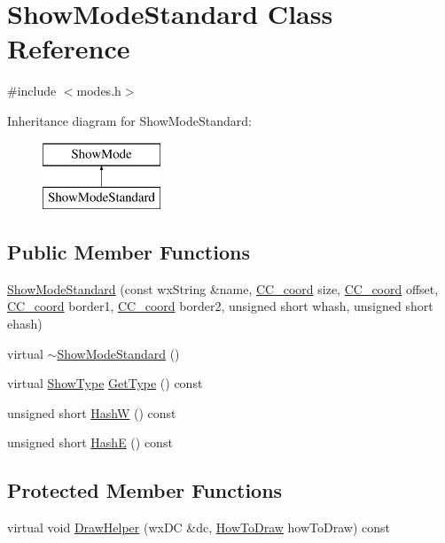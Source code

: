 \hypertarget{a00143}{\section{Show\-Mode\-Standard Class Reference}
\label{a00143}
}


{\ttfamily \#include $<$modes.\-h$>$}

Inheritance diagram for Show\-Mode\-Standard\-:\begin{figure}[H]
\begin{center}
\leavevmode
\includegraphics[height=2.000000cm]{a00143}
\end{center}
\end{figure}
\subsection*{Public Member Functions}
\begin{DoxyCompactItemize}
\item 
\hyperlink{a00143_a53cf0b052b5a1a1063d29d54f66802a9}{Show\-Mode\-Standard} (const wx\-String \&name, \hyperlink{a00029}{C\-C\-\_\-coord} size, \hyperlink{a00029}{C\-C\-\_\-coord} offset, \hyperlink{a00029}{C\-C\-\_\-coord} border1, \hyperlink{a00029}{C\-C\-\_\-coord} border2, unsigned short whash, unsigned short ehash)
\item 
virtual \hyperlink{a00143_a60a6932419eefa7b620f7482bc8b2c5e}{$\sim$\-Show\-Mode\-Standard} ()
\item 
virtual \hyperlink{a00140_a03678eaf2ac733b19b863d9fef35077c}{Show\-Type} \hyperlink{a00143_ac5940b26b7d0a30a8c37966853fdb8a7}{Get\-Type} () const 
\item 
unsigned short \hyperlink{a00143_a7fd90cab74eea075fa43dde0612be3f6}{Hash\-W} () const 
\item 
unsigned short \hyperlink{a00143_a9bd103ae17dce96531b99d510b4850aa}{Hash\-E} () const 
\end{DoxyCompactItemize}
\subsection*{Protected Member Functions}
\begin{DoxyCompactItemize}
\item 
virtual void \hyperlink{a00143_aa53dd62dbdf1de91b3b4d611ce238328}{Draw\-Helper} (wx\-D\-C \&dc, \hyperlink{a00140_ad4ba026a6f87cccc7b00eae19c55bd87}{How\-To\-Draw} how\-To\-Draw) const 
\end{DoxyCompactItemize}
